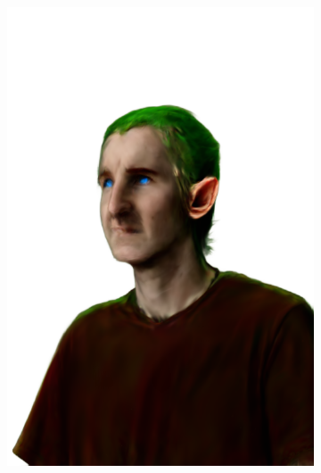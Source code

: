 \begin{figure}
\begin{subfigure}{0.18\linewidth}
        \includegraphics[width=\textwidth]{Figures/failed/igs2gs/34_render.png}

\end{subfigure}
\end{figure}
